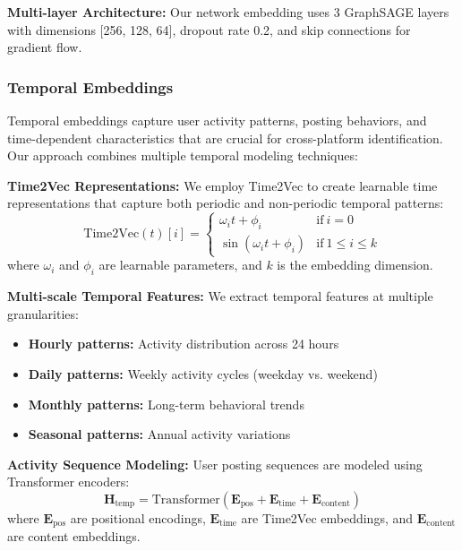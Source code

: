 \documentclass[conference]{IEEEtran}
\begin{document}
\textbf{Multi-layer Architecture:} Our network embedding uses 3 GraphSAGE layers with dimensions [256, 128, 64], dropout rate 0.2, and skip connections for gradient flow.

\subsubsection{Temporal Embeddings}

Temporal embeddings capture user activity patterns, posting behaviors, and time-dependent characteristics that are crucial for cross-platform identification. Our approach combines multiple temporal modeling techniques:

\textbf{Time2Vec Representations:} We employ Time2Vec \cite{kazemi2019time2vec} to create learnable time representations that capture both periodic and non-periodic temporal patterns:
\begin{equation}
\text{Time2Vec}(t)[i] = \begin{cases}
\omega_i t + \phi_i & \text{if}\ i = 0 \\
\sin(\omega_i t + \phi_i) & \text{if}\ 1 \leq i \leq k
\end{cases}
\end{equation}
where $\omega_i$ and $\phi_i$ are learnable parameters, and $k$ is the embedding dimension.

\textbf{Multi-scale Temporal Features:} We extract temporal features at multiple granularities:
\begin{itemize}
\item \textbf{Hourly patterns:} Activity distribution across 24 hours
\item \textbf{Daily patterns:} Weekly activity cycles (weekday vs. weekend)
\item \textbf{Monthly patterns:} Long-term behavioral trends
\item \textbf{Seasonal patterns:} Annual activity variations
\end{itemize}

\textbf{Activity Sequence Modeling:} User posting sequences are modeled using Transformer encoders:
\begin{equation}
\mathbf{H}_{\text{temp}} = \text{Transformer}(\mathbf{E}_{\text{pos}} + \mathbf{E}_{\text{time}} + \mathbf{E}_{\text{content}})
\end{equation}
where $\mathbf{E}_{\text{pos}}$ are positional encodings, $\mathbf{E}_{\text{time}}$ are Time2Vec embeddings, and $\mathbf{E}_{\text{content}}$ are content embeddings.
\end{document}
